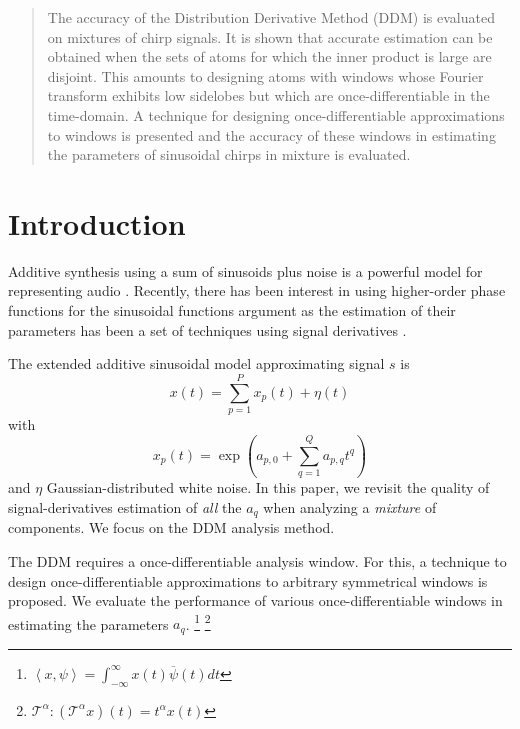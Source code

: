 \documentclass[plainsections,landscape]{sciposter}
\begin{document}
\setlength{\columnseprule}{0pt}
\begin{multicols}{5}

\begin{abstract}
    The accuracy of the Distribution Derivative Method (DDM)
    \cite{betser2009sinusoidal} is evaluated on mixtures of chirp signals. It is
    shown that accurate estimation can be obtained when the sets of atoms for
    which the inner product is large are disjoint.  This amounts to designing
    atoms with windows whose Fourier transform exhibits low sidelobes but which
    are once-differentiable in the time-domain. A technique for designing
    once-differentiable approximations to windows is presented and the accuracy
    of these windows in estimating the parameters of sinusoidal chirps in
    mixture is evaluated.
\end{abstract}

\section{Introduction}
\label{sec:intro}
Additive synthesis using a sum of sinusoids plus noise is a powerful model for
representing audio \cite{serra1989system}.
%
Recently, there has
been interest in using higher-order phase functions for the sinusoidal
    functions argument \cite{xuepiecewise} as the estimation of
their parameters has been a set of techniques 
using signal derivatives \cite{hamilton2012unified}.

The extended additive sinusoidal model approximating signal $s$ is 
%
\begin{equation}
    x(t) = \sum_{p=1}^{P} x_{p}(t) + \eta(t)
\end{equation}
%
with
%
\begin{equation}
    \label{eq:polyphaseexpmix}
    x_{p}(t) = \exp(a_{p,0} + \sum_{q=1}^{Q} a_{p,q} t^q)
\end{equation}
%
and $\eta$ Gaussian-distributed white noise. In this paper, we revisit the quality of signal-derivatives estimation of
\textit{all} the $a_{q}$ when analyzing a \textit{mixture} of components. We focus on
the DDM \cite{betser2009sinusoidal} analysis method. 

The DDM requires a once-differentiable analysis window. For this, a technique to design
once-differentiable approximations to arbitrary symmetrical windows is
    proposed.
We evaluate the performance of various once-differentiable windows in estimating
the parameters $a_{q}$.
\footnote{
        $\left\langle x , \psi \right\rangle = 
    \int_{-\infty}^{\infty}x(t)\overline{\psi}(t)dt$
}
%
\footnote{
$\mathcal{T}^{\alpha} : (\mathcal{T}^{\alpha}x)(t) = t^{\alpha}x(t)$
}


\end{multicols}
\end{document}
